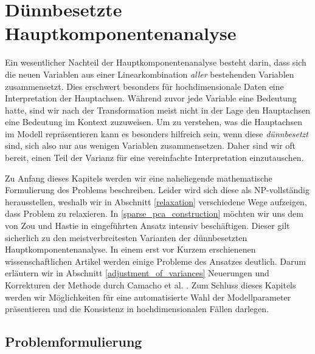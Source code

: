 \chapter{Dünnbesetzte Hauptkomponentenanalyse}

\label{sparse_pca}

Ein wesentlicher Nachteil der Hauptkomponentenanalyse besteht darin, dass sich die neuen Variablen aus einer Linearkombination \textit{aller} bestehenden Variablen zusammensetzt. Dies erschwert besonders für hochdimensionale Daten eine Interpretation der Hauptachsen. Während zuvor jede Variable eine Bedeutung hatte, sind wir nach der Transformation meist nicht in der Lage den Hauptachsen eine Bedeutung im Kontext zuzuweisen. Um zu verstehen, was die Hauptachsen im Modell repräsentieren kann es besonders hilfreich sein, wenn diese \textit{dünnbesetzt} sind, sich also nur aus wenigen Variablen zusammensetzen. Daher sind wir oft bereit, einen Teil der Varianz für eine vereinfachte Interpretation einzutauschen.

Zu Anfang dieses Kapitels werden wir eine naheliegende mathematische Formulierung des Problems beschreiben. Leider wird sich diese als NP-vollständig herausstellen, weshalb wir in Abschnitt \ref{relaxation} verschiedene Wege aufzeigen, dass Problem zu relaxieren. In \ref{sparse_pca_construction} möchten wir uns dem von Zou und Hastie in \cite{zou_sparsepca} eingeführten Ansatz intensiv beschäftigen. Dieser gilt sicherlich zu den meistverbreitesten Varianten der dünnbesetzten Hauptkomponentenanalyse. In einem erst vor Kurzem erschienenen wissenschaftlichen Artikel werden einige Probleme des Ansatzes deutlich. Darum erläutern wir in Abschnitt \ref{adjustment_of_variances} Neuerungen und Korrekturen der Methode durch Camacho et al. \cite{camacho}. Zum Schluss dieses Kapitels werden wir Möglichkeiten für eine automatisierte Wahl der Modellparameter präsentieren und die Konsistenz in hochdimensionalen Fällen darlegen.




\section{Problemformulierung}
\label{problem_formulation}


